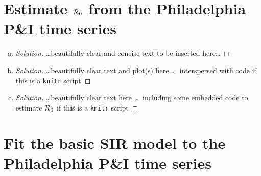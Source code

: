 \documentclass[12pt]{article}\usepackage[]{graphicx}\usepackage[]{color}
\begin{document}
\section{Estimate ${\cal R}_0$ from the Philadelphia P\&I time series}

\begin{enumerate}[(a)]

\item \EstimateRna

 {\color{blue} \begin{proof}[Solution]
 {\color{magenta}\dots beautifully clear and concise text to be inserted here\dots}
 \end{proof}
 }

\item \EstimateRnb

  {\color{blue} \begin{proof}[Solution]
  {\color{magenta}\dots beautifully clear text and plot(s) here \dots\ interspersed with \Rlogo code if this is a \texttt{knitr} script}
  \end{proof}
  }

\item \EstimateRnc

  {\color{blue} \begin{proof}[Solution]
  {\color{magenta}\dots beautifully clear text here \dots\ including some embedded \Rlogo code to estimate ${\cal R}_0$ if this is a \texttt{knitr} script}
  \end{proof}
  }

\end{enumerate}

\section{Fit the basic SIR model to the Philadelphia P\&I time series}
\end{document}
